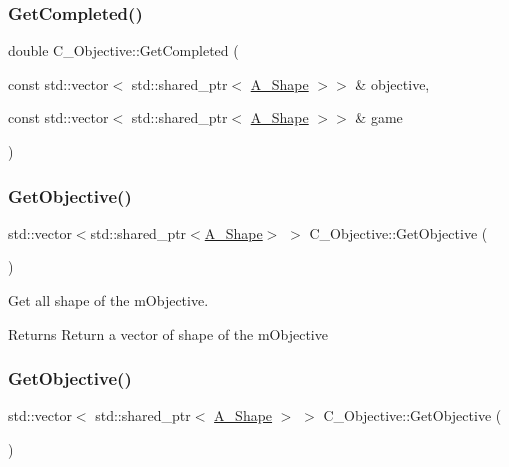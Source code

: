 \subsubsection{\texorpdfstring{Get\+Completed()}{GetCompleted()}\hspace{0.1cm}{\footnotesize\ttfamily [2/2]}}
{\footnotesize\ttfamily double C\+\_\+\+Objective\+::\+Get\+Completed (\begin{DoxyParamCaption}\item[{const std\+::vector$<$ std\+::shared\+\_\+ptr$<$ \hyperlink{classA__Shape}{A\+\_\+\+Shape} $>$$>$ \&}]{objective,  }\item[{const std\+::vector$<$ std\+::shared\+\_\+ptr$<$ \hyperlink{classA__Shape}{A\+\_\+\+Shape} $>$$>$ \&}]{game }\end{DoxyParamCaption})}

\mbox{\label{classC__Objective_a8cba23f01d8d239f5ee94326fda53570}} 
\subsubsection{\texorpdfstring{Get\+Objective()}{GetObjective()}\hspace{0.1cm}{\footnotesize\ttfamily [1/2]}}
{\footnotesize\ttfamily std\+::vector$<$std\+::shared\+\_\+ptr$<$\hyperlink{classA__Shape}{A\+\_\+\+Shape}$>$ $>$ C\+\_\+\+Objective\+::\+Get\+Objective (\begin{DoxyParamCaption}{ }\end{DoxyParamCaption})}



Get all shape of the m\+Objective. 

\begin{DoxyReturn}{Returns}
Return a vector of shape of the m\+Objective 
\end{DoxyReturn}
\mbox{\label{classC__Objective_aa8e3dea19bd4578246b183d2bad2d475}} 
\subsubsection{\texorpdfstring{Get\+Objective()}{GetObjective()}\hspace{0.1cm}{\footnotesize\ttfamily [2/2]}}
{\footnotesize\ttfamily std\+::vector$<$ std\+::shared\+\_\+ptr$<$ \hyperlink{classA__Shape}{A\+\_\+\+Shape} $>$ $>$ C\+\_\+\+Objective\+::\+Get\+Objective (\begin{DoxyParamCaption}{ }\end{DoxyParamCaption})}



